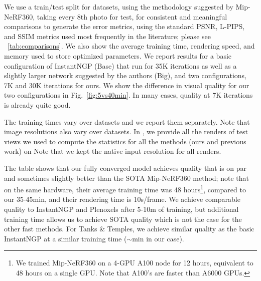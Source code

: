 We use a train/test split for datasets, using the methodology suggested by Mip-NeRF360, taking every 8th photo for test, for consistent and meaningful comparisons to generate the error metrics, using the standard PSNR, L-PIPS, and SSIM metrics used most frequently in the literature; please see ~\ref{tab:comparisons}. 
We also show the average training time, rendering speed, and memory used to store optimized parameters. We report results for a basic configuration of InstantNGP (Base) that run for 35K iterations as well as a slightly larger network suggested by the authors (Big), and two configurations, 7K and 30K iterations for ours. 
We show the difference in visual quality for our two configurations in Fig.~\ref{fig:5vs40min}. In many cases, quality at 7K iterations is already quite good.

The training times vary over datasets and we report them separately. Note that image resolutions also vary over datasets.
In , we provide all the renders of test views we used to compute the statistics for all the methods (ours and previous work) on  Note that we kept the native input resolution for all renders.







The table shows that our fully converged model achieves quality that is on par and sometimes slightly better than the SOTA Mip-NeRF360 method; note that on the same hardware, their average training time was 48 hours\footnote{We trained Mip-NeRF360 on a 4-GPU A100 node for 12 hours, equivalent to 48 hours on a single GPU. Note that A100's are faster than A6000 GPUs.}, compared to our 35-45min, and their rendering time is 10s/frame. We achieve comparable quality to InstantNGP and Plenoxels after 5-10m of training, but additional training time allows us to achieve SOTA quality which is not the case for the other fast methods. For Tanks \& Temples, we achieve similar quality as the basic InstantNGP at a similar training time ($\sim$min in our case).

